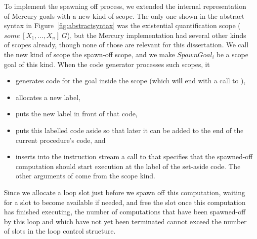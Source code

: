 To implement the spawning off process,
we extended the internal representation of Mercury goals
with a new kind of scope.
The only one shown in the abstract syntax in
Figure~\ref{fig:abstractsyntax}
was the existential quantification scope
($some~[X_1,\ldots,X_n]~G$),
but the Mercury implementation had several other kinds of scopes already,
though none of those are relevant for this dissertation.
We call the new kind of scope the spawn-off scope,
and we make $SpawnGoal_i$ be a scope goal of this kind.
When the code generator processes such scopes,
it
\begin{itemize}
\item
generates code for the goal inside the scope
(which will end with a call to \lcjoinandterminate),
\item
allocates a new label,
\item
puts the new label in front of that code,
\item
puts this labelled code aside so that
later it can be added to the end of the current procedure's code, and
\item
inserts into the instruction stream a call to \lcspawnoff
that specifies that the spawned-off computation should start execution
at the label of the set-aside code.
The other arguments of \lcspawnoff come from the scope kind.
\end{itemize}

\noindent
Since we allocate a loop slot 
just before we spawn off this computation,
waiting for a slot to become available if needed,
and free the slot once this computation has finished executing,
the number of computations that have been spawned-off by this loop
and which have not yet been terminated
cannot exceed the number of slots in the loop control structure.

